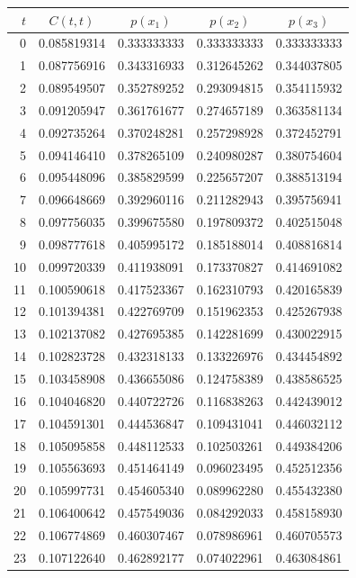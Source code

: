 \begin{tabular}{rcccc}
\toprule
$t$ & $C(t,t)$ & $p(x_1)$ & $p(x_2)$ & $p(x_3)$ \\
\midrule
0 & 0.085819314 & 0.333333333 & 0.333333333 & 0.333333333 \\
1 & 0.087756916 & 0.343316933 & 0.312645262 & 0.344037805 \\
2 & 0.089549507 & 0.352789252 & 0.293094815 & 0.354115932 \\
3 & 0.091205947 & 0.361761677 & 0.274657189 & 0.363581134 \\
4 & 0.092735264 & 0.370248281 & 0.257298928 & 0.372452791 \\
5 & 0.094146410 & 0.378265109 & 0.240980287 & 0.380754604 \\
6 & 0.095448096 & 0.385829599 & 0.225657207 & 0.388513194 \\
7 & 0.096648669 & 0.392960116 & 0.211282943 & 0.395756941 \\
8 & 0.097756035 & 0.399675580 & 0.197809372 & 0.402515048 \\
9 & 0.098777618 & 0.405995172 & 0.185188014 & 0.408816814 \\
10 & 0.099720339 & 0.411938091 & 0.173370827 & 0.414691082 \\
11 & 0.100590618 & 0.417523367 & 0.162310793 & 0.420165839 \\
12 & 0.101394381 & 0.422769709 & 0.151962353 & 0.425267938 \\
13 & 0.102137082 & 0.427695385 & 0.142281699 & 0.430022915 \\
14 & 0.102823728 & 0.432318133 & 0.133226976 & 0.434454892 \\
15 & 0.103458908 & 0.436655086 & 0.124758389 & 0.438586525 \\
16 & 0.104046820 & 0.440722726 & 0.116838263 & 0.442439012 \\
17 & 0.104591301 & 0.444536847 & 0.109431041 & 0.446032112 \\
18 & 0.105095858 & 0.448112533 & 0.102503261 & 0.449384206 \\
19 & 0.105563693 & 0.451464149 & 0.096023495 & 0.452512356 \\
20 & 0.105997731 & 0.454605340 & 0.089962280 & 0.455432380 \\
21 & 0.106400642 & 0.457549036 & 0.084292033 & 0.458158930 \\
22 & 0.106774869 & 0.460307467 & 0.078986961 & 0.460705573 \\
23 & 0.107122640 & 0.462892177 & 0.074022961 & 0.463084861 \\

\end{tabular}
